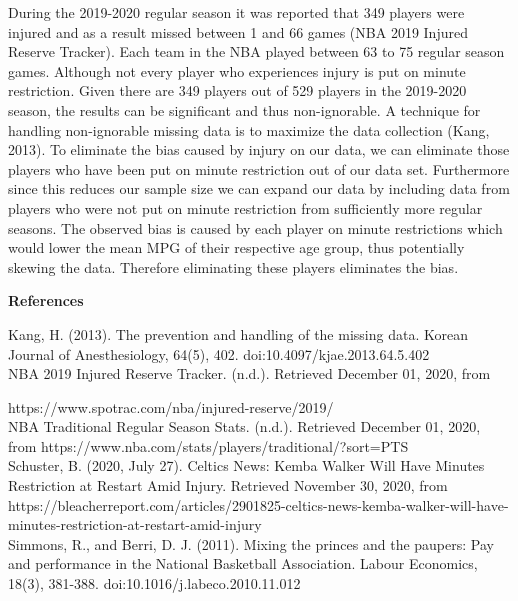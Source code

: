 \documentclass{article}
\begin{document}
During the 2019-2020 regular season it was reported that 349 players were injured and as a result missed between 1 and 66 games (NBA 2019 Injured Reserve Tracker). Each team in the NBA played between 63 to 75 regular season games. Although not every player who experiences injury is put on minute restriction. Given there are 349 players out of 529 players in the 2019-2020 season, the results can be significant and thus non-ignorable. A technique for handling non-ignorable missing data is to maximize the data collection (Kang, 2013). To eliminate the bias caused by injury on our data, we can eliminate those players who have been put on minute restriction out of our data set. Furthermore since this reduces our sample size we can expand our data by including data from players who were not put on minute restriction from sufficiently more regular seasons. The observed bias is caused by each player on minute restrictions which would lower the mean MPG of their respective age group, thus potentially skewing the data. Therefore eliminating these players eliminates the bias. 

\newpage
\begin{center} 
\textbf{References}
\end{center}
Kang, H. (2013). The prevention and handling of the missing data. Korean Journal of Anesthesiology, 64(5), 402. doi:10.4097/kjae.2013.64.5.402\\


NBA 2019 Injured Reserve Tracker. (n.d.). Retrieved December 01, 2020, from   


https://www.spotrac.com/nba/injured-reserve/2019/\\

NBA Traditional Regular Season Stats. (n.d.). Retrieved December 01, 2020, from https://www.nba.com/stats/players/traditional/?sort=PTS\\


Schuster, B. (2020, July 27). Celtics News: Kemba Walker Will Have Minutes Restriction at Restart Amid Injury. Retrieved November 30, 2020, from https://bleacherreport.com/articles/2901825-celtics-news-kemba-walker-will-have-minutes-restriction-at-restart-amid-injury\\


Simmons, R., and Berri, D. J. (2011). Mixing the princes and the paupers: Pay and performance in the National Basketball Association. Labour Economics, 18(3), 381-388. doi:10.1016/j.labeco.2010.11.012\\
\end{document}
